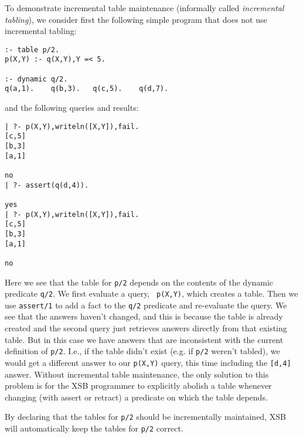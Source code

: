 To demonstrate incremental table maintenance (informally called {\em
  incremental tabling}), we consider first the following simple
program that does not use incremental tabling:
\begin{verbatim}
:- table p/2.
p(X,Y) :- q(X,Y),Y =< 5.

:- dynamic q/2.
q(a,1).    q(b,3).   q(c,5).    q(d,7).
\end{verbatim}
and the following queries and results:
\begin{verbatim}
| ?- p(X,Y),writeln([X,Y]),fail.
[c,5]
[b,3]
[a,1]

no
| ?- assert(q(d,4)).

yes
| ?- p(X,Y),writeln([X,Y]),fail.
[c,5]
[b,3]
[a,1]

no
\end{verbatim}
%
Here we see that the table for {\tt p/2} depends on the contents of
the dynamic predicate {\tt q/2}.  We first evaluate a query, {\tt
  p(X,Y)}, which creates a table.  Then we use {\tt assert/1} to add a
fact to the {\tt q/2} predicate and re-evaluate the query.  We see
that the answers haven't changed, and this is because the table is
already created and the second query just retrieves answers directly
from that existing table.  But in this case we have answers that are
inconsistent with the current definition of {\tt p/2}.  I.e., if the
table didn't exist (e.g. if {\tt p/2} weren't tabled), we would get a
different answer to our {\tt p(X,Y)} query, this time including the
{\tt [d,4]} answer.  Without incremental table maintenance, the only
solution to this problem is for the XSB programmer to explicitly
abolish a table whenever changing (with assert or retract) a predicate
on which the table depends.

By declaring that the tables for {\tt p/2} should be incrementally
maintained, XSB will automatically keep the tables for {\tt p/2}
correct.

